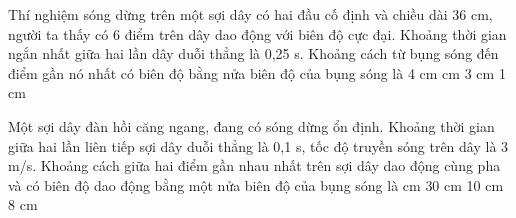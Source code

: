 \begin{ex}%
Thí nghiệm sóng dừng trên một sợi dây có hai đầu cố định và chiều dài 36 cm, người ta thấy có 6 điểm trên dây dao động với biên độ cực đại. Khoảng thời gian ngắn nhất giữa hai lần dây duỗi thẳng là 0,25 s. Khoảng cách từ bụng sóng đến điểm gần nó nhất có biên độ bằng nửa biên độ của bụng sóng là
\choice
{4 cm}
{ cm}
{3 cm}
{1 cm}
\end{ex} 
\begin{ex}%
Một sợi dây đàn hồi căng ngang, đang có sóng dừng ổn định. Khoảng thời gian giữa hai lần liên tiếp sợi dây duỗi thẳng là 0,1 s, tốc độ truyền sóng trên dây là 3 m/s. Khoảng cách giữa hai điểm gần nhau nhất trên sợi dây dao động cùng pha và có biên độ dao động bằng một nửa biên độ của bụng sóng là
\choice
{ cm}
{30 cm}
{10 cm}
{8 cm}
\end{ex} 
